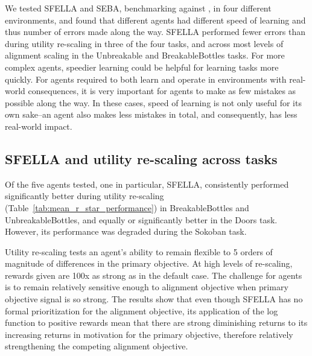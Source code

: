 


We tested SFELLA and SEBA, benchmarking against \tloA{}, in four different environments, and found that different agents had different speed of learning and thus number of errors made along the way. SFELLA performed fewer errors than \tloA{} during utility re-scaling in three of the four tasks, and across most levels of alignment scaling in the Unbreakable and BreakableBottles tasks. For more complex agents, speedier learning could be helpful for learning tasks more quickly. For agents required to both learn and operate in environments with real-world consequences, it is very important for agents to make as few mistakes as possible along the way. In these cases, speed of learning is not only useful for its own sake--an agent also makes less mistakes in total, and consequently, has less real-world impact.

\subsection{SFELLA and utility re-scaling across tasks}

Of the five agents tested, one in particular, SFELLA, consistently performed significantly better during utility re-scaling (Table~\ref{tab:mean_r_star_performance}) in BreakableBottles and UnbreakableBottles, and equally or significantly better in the Doors task. However, its performance was degraded during the Sokoban task.

Utility re-scaling tests an agent's ability to remain flexible to 5 orders of magnitude of differences in the primary objective. At high levels of re-scaling, rewards given are 100x as strong as in the default case. The challenge for agents is to remain relatively sensitive enough to alignment objective when primary objective signal is so strong. The results show that even though SFELLA has no formal prioritization for the alignment objective, its application of the log function to positive rewards mean that there are strong diminishing returns to its increasing returns in motivation for the primary objective, therefore relatively strengthening the competing alignment objective.

